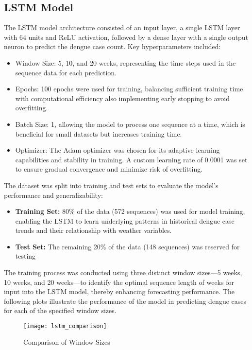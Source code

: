 \subsection{LSTM Model}
The LSTM model architecture consisted of an input layer, a single LSTM layer with 64 units and ReLU activation, followed by a dense layer with a single output neuron to predict the dengue case count. Key hyperparameters included:
\begin{itemize}
	\item Window Size: 5, 10, and 20 weeks, representing the time steps used in the sequence data for each prediction.
	\item Epochs: 100 epochs were used for training, balancing sufficient training time with computational efficiency also implementing early stopping to avoid overfitting.
	\item Batch Size: 1, allowing the model to process one sequence at a time, which is beneficial for small datasets but increases training time.
	\item Optimizer: The Adam optimizer was chosen for its adaptive learning capabilities and stability in training. A custom learning rate of 0.0001 was set to ensure gradual convergence and minimize risk of overfitting.
\end{itemize}

The dataset was split into training and test sets to evaluate the model’s performance and generalizability:
\begin{itemize}
	\item \textbf{Training Set:} 80\% of the data (572 sequences) was used for model training, enabling the LSTM to learn underlying patterns in historical dengue case trends and their relationship with weather variables.
	\item \textbf{Test Set:} The remaining 20\% of the data (148 sequences) was reserved for testing
\end{itemize}

The training process was conducted using three distinct window sizes—5 weeks, 10 weeks, and 20 weeks—to identify the optimal sequence length of weeks for input into the LSTM model, thereby enhancing forecasting performance. The following plots illustrate the performance of the model in predicting dengue cases for each of the specified window sizes.

\begin{figure}[H]
	\centering
	\texttt{[image: lstm\_comparison]}
	\caption{Comparison of Window Sizes}
	\label{fig:lstm_comparison}
\end{figure}

